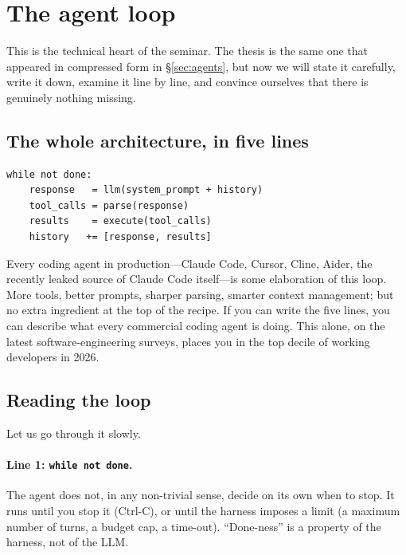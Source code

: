 
\section{The agent loop}\label{sec:agent-loop}

This is the technical heart of the seminar.  The thesis is the same
one that appeared in compressed form in \S\ref{sec:agents}, but now
we will state it carefully, write it down, examine it line by line,
and convince ourselves that there is genuinely nothing missing.

\subsection{The whole architecture, in five lines}

\begin{keyresult}\label{kr:agent-loop}
  \begin{lstlisting}
while not done:
    response   = llm(system_prompt + history)
    tool_calls = parse(response)
    results    = execute(tool_calls)
    history   += [response, results]
  \end{lstlisting}
\end{keyresult}

\begin{remark}
  Every coding agent in production---Claude Code, Cursor, Cline,
  Aider, the recently leaked source of Claude Code itself---is some
  elaboration of this loop.  More tools, better prompts, sharper
  parsing, smarter context management; but no extra ingredient at
  the top of the recipe.  If you can write the five lines, you can
  describe what every commercial coding agent is doing.  This
  alone, on the latest software-engineering surveys, places you
  in the top decile of working developers in 2026.
\end{remark}

\subsection{Reading the loop}

Let us go through it slowly.

\paragraph{Line 1: \texttt{while not done}.}
The agent does not, in any non-trivial sense, decide on its own
when to stop.  It runs until you stop it (Ctrl-C), or until the
harness imposes a limit (a maximum number of turns, a budget cap,
a time-out).  ``Done-ness'' is a property of the harness, not of
the LLM.

